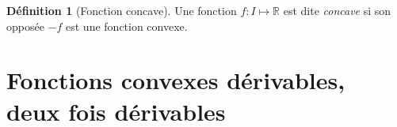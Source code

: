 \documentclass[11pt,a4paper]{report}
\theoremstyle{definition}
\newtheorem{dfn}[theorem]{Définition}
\begin{document}
\begin{dfn}[Fonction concave]
    \begin{minipage}{0.4\textwidth}
    Une fonction $f : I \mapsto \ensuremath{\mathbb{R}}$ est dite \emph{concave} si son opposée $-f$ est une fonction convexe. 
    \end{minipage}\hspace{0.2\textwidth}
    \begin{minipage}{0.4\textwidth}
    \begin{center}
    \end{center}
    \end{minipage}
\end{dfn}

\section{Fonctions convexes dérivables, deux fois dérivables} %
\label{sec:fonctions_convexes_derivables_deux_fois_derivables}
\end{document}
